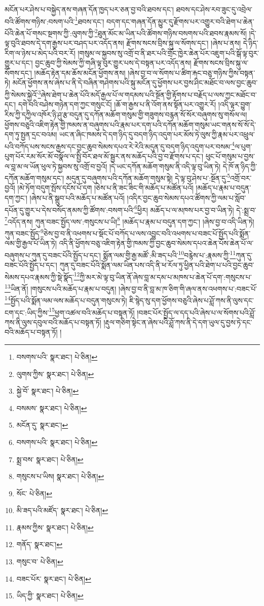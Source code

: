 མངོན་པར་ཤེས་པ་བསྐྱེད་ནས་གཞན་དོན་ཁྱད་པར་ཅན་བྱ་བའི་ཐབས་དང་། ཐབས་དང་ཤེས་རབ་ཟུང་དུ་འབྲེལ་བའི་ཚོགས་གཉིས་:བསག་པའི་\footnote{བསགས་པའི་  སྣར་ཐང་།  པེ་ཅིན། }ཐབས་དང་། བདག་དང་གཞན་དོན་མྱུར་དུ་རྫོགས་པར་འགྱུར་བའི་ཐེག་པ་ཆེན་པོའི་ཆེན་པོ་གསང་སྔགས་ཀྱི་:ལུགས་ཀྱི་\footnote{ལུགས་ཀྱིས་  སྣར་ཐང་།  པེ་ཅིན། }ཐུན་མོང་མ་ཡིན་པའི་ཚོགས་གཉིས་བསགས་པའི་ཐབས་རྣམས་སོ། །དེ་ལྟ་བུའི་ཐབས་དེ་དག་རྒྱས་པར་བཤད་པར་འདོད་ནས། རྫོགས་སངས་བྲིས་སྐུ་ལ་སོགས་དང་། །ཞེས་པ་ནས། དེ་ཉིད་རིག་ལ་ཉེས་པ་མེད་པའི་བར་རོ། །གསུམ་ལ་སྐྱབས་སུ་འགྲོ་བ་ནི་ཐར་པའི་གྲོང་ཁྱེར་ཆེན་པོར་འཇུག་པའི་སྒོ་ལྟ་བུར་གྱུར་པ་དང་། བྱང་ཆུབ་ཀྱི་སེམས་ཀྱི་གཞི་ལྟ་བུར་གྱུར་པས་དེ་བསྟན་པར་འདོད་ནས། རྫོགས་སངས་བྲིས་སྐུ་ལ་སོགས་དང་། །མཆོད་རྟེན་དམ་ཆོས་མངོན་ཕྱོགས་ནས། །ཞེས་བྱ་བ་ལ་སོགས་པ་ཚིག་རྐང་བཅུ་གཉིས་ཀྱིས་བསྟན་ཏེ། མངོན་ཕྱོགས་ནས་ཞེས་པ་ནི་དེ་བཞིན་གཤེགས་པའི་སྐུ་མངོན་དུ་ཕྱོགས་པར་བྱས་ཤིང་མཐོང་བ་ལས་བྱང་ཆུབ་ཀྱི་སེམས་སྐྱེའོ་\footnote{སྐྱེ་བོ་  སྣར་ཐང་།  པེ་ཅིན། }ཞེས་ཐེག་པ་ཆེན་པོའི་མདོ་རྒྱལ་པོ་ལ་གདམས་པའི་སྔོན་གྱི་རྟོགས་པ་བརྗོད་པ་ལས་ཀྱང་མཐོང་བ་དང་། དགེ་བའི་བཤེས་གཉེན་དག་ཀྱང་གསུང་ངོ། །ཆོ་ག་རྒྱས་པ་ནི་འོག་ནས་སྟོན་པར་འགྱུར་རོ། །འདི་ལྟར་བྱུག་རིས་ཀྱི་དཀྱིལ་འཁོར་ཉི་ཤུ་རྩ་བདུན་དུ་དཀོན་མཆོག་གསུམ་གྱི་གཟུགས་བརྙན་སོ་སོར་བཞུགས་སུ་གསོལ་ལ། ཕྱོགས་བཅུའི་འཇིག་རྟེན་གྱི་ཁམས་ན་བཞུགས་པའི་རྣམ་པར་དག་པའི་དཀོན་མཆོག་གསུམ་ཡང་གནས་སོ་སོ་དེ་དག་ཏུ་སྤྱན་དྲང་བའམ། ཡང་ན་ཞིང་ཁམས་དེ་དག་ཉིད་དུ་བདག་ཉིད་འདུག་པར་མོས་ཏེ་ལུས་ཀྱི་རྣམ་པར་འཕྲུལ་པའི་བཀོད་པས་སངས་རྒྱས་དང་བྱང་ཆུབ་སེམས་དཔའ་རེ་རེའི་མདུན་དུ་བདག་ཉིད་འདུག་པར་བསམ་\footnote{བསམས་  སྣར་ཐང་།  པེ་ཅིན། }ལ་པུག་པུག་པོར་རམ་སོར་མོ་བསྣོལ་ལ་སྤྱི་བོར་ཐལ་མོ་སྦྱར་ནས་མཆོད་པའི་བྱ་བ་རྫོགས་པ་དང་། ཕུང་པོ་གསུམ་པ་བྱས་ལ་བླ་མ་ལ་ཡོན་ཕུལ་ཏེ་སྐྱབས་སུ་འགྲོ་བ་བྱའོ། །དེ་ཡང་དཀོན་མཆོག་གསུམ་ནི་འདི་ལྟ་བུ་ཡིན་ཏེ། དེ་ཁོ་ན་ཉིད་ཀྱི་དཀོན་མཆོག་གསུམ་དང་། མདུན་དུ་བཞུགས་པའི་དཀོན་མཆོག་གསུམ་སྟེ། དེ་ལྟ་བུ་ཤེས་པ་:སྔོན་དུ་\footnote{མངོན་དུ་  སྣར་ཐང་། }འགྲོ་བར་བྱའོ། །མེ་ཏོག་བདུག་སྤོས་དངོས་པོ་དག །ཅེས་པ་ནི་ཟང་ཟིང་གི་མཆོད་པ་མཚོན་པའོ། །མཆོད་པ་རྣམ་པ་བདུན་དག་ཀྱང་། །ཞེས་པ་ནི་སྒྲུབ་པའི་མཆོད་པ་མཚོན་པའོ། །འདིར་བྱང་ཆུབ་སེམས་དཔའ་ཚོགས་ཀྱི་ལམ་པ་སློབ་དཔོན་དུ་གྱུར་པ་དེས་བསོད་ནམས་ཀྱི་ཚོགས་:བསག་པའི་\footnote{བསགས་པའི་  སྣར་ཐང་།  པེ་ཅིན། }ཕྱིར། མཆོད་པ་ལ་མཁས་པར་བྱ་བ་ཡིན་ཏེ། དེ་:སྨྲ་བ་\footnote{སྨྲ་བས་  སྣར་ཐང་།  པེ་ཅིན། }འདོད་ནས། ཀུན་བཟང་སྤྱོད་ལས་:གསུངས་པ་ཡི།\footnote{གསུངས་པ་ཡིས།  སྣར་ཐང་།  པེ་ཅིན། } །མཆོད་པ་རྣམ་པ་བདུན་དག་ཀྱང་། །ཞེས་བྱ་བ་འདི་ཡིན་ཏེ། ཀུན་བཟང་སྤྱོད་\footnote{སོང་  པེ་ཅིན། }ཅེས་བྱ་བ་ནི་འཕགས་པ་སྡོང་པོ་བཀོད་པ་ལས་འབྱུང་བའི་འཕགས་པ་བཟང་པོ་སྤྱོད་པའི་སྨོན་ལམ་གྱི་རྒྱལ་པོ་ཡིན་ཏེ། འདི་ནི་ཕྱོགས་བཅུ་འཇིག་རྟེན་གྱི་ཁམས་ཀྱི་བྱང་ཆུབ་སེམས་དཔའ་ཆེན་པོས་ཆེན་པོ་ལ་བཞུགས་པ་ཀུན་དུ་བཟང་པོའི་སྤྱོད་པ་དང་། སྨོན་ལམ་གྱི་རྒྱ་མཚོ་:མི་ཟད་པའི་\footnote{མི་ཟད་པའི་མཛོད་  སྣར་ཐང་།  པེ་ཅིན། }བརྙེས་པ་:རྣམས་ཀྱི་\footnote{རྣམས་ཀྱིས་  སྣར་ཐང་།  པེ་ཅིན། }ཀུན་དུ་བཟང་པོའི་སྤྱོད་པ་དང་། ཀུན་དུ་བཟང་པོའི་སྨོན་ལམ་ཡིན་པས་འདི་ནི་ཕ་རོལ་ཏུ་ཕྱིན་པའི་ཐེག་པ་པའི་བྱང་ཆུབ་སེམས་དཔའ་རྣམས་ཀྱི་སྡེ་སྣོད་\footnote{གནོད་  སྣར་ཐང་། }ཀྱི་མར་མེ་ལྟ་བུ་ཡིན་ནོ་ཞེས་བླ་མ་དམ་པ་མཁས་པ་ཆེན་པོ་དག་:གསུངས་པ་\footnote{གསུང་བ་  པེ་ཅིན། }ཡིན་ནོ། །གསུངས་པའི་མཆོད་པ་རྣམ་པ་བདུན། །ཞེས་བྱ་བ་ནི་བླ་མ་ཁ་ཅིག་གི་ཞལ་ནས་འཕགས་པ་:བཟང་པོ་\footnote{བཟང་པོར་  སྣར་ཐང་།  པེ་ཅིན། }སྤྱོད་པའི་སྨོན་ལམ་ལས་མཆོད་པ་བདུན་གསུངས་ཏེ། ཇི་སྙེད་སུ་དག་ཕྱོགས་བཅུའི་ཞེས་པ་ཤློ་ཀས་ནི་ལུས་དང་ངག་དང་:ཡིད་ཀྱིས་\footnote{ཡིད་ཀྱི་  སྣར་ཐང་།  པེ་ཅིན། }ཕྱག་འཚལ་བའི་མཆོད་པ་བསྟན་ཏོ། །བཟང་པོར་སྤྱོད་ལ་དད་པའི་ཞེས་པ་ལ་སོགས་པའི་ཤློ་ཀས་ནི་ལུས་དབུལ་བའི་མཆོད་པ་བསྟན་ཏོ། །རྡུལ་གཅིག་སྟེང་ན་ཞེས་པའི་ཤློ་ཀས་ནི་དེ་དག་ཡུལ་དུ་བྱས་ཏེ་དང་བའི་མཆོད་པ་བསྟན་ཏོ། །
